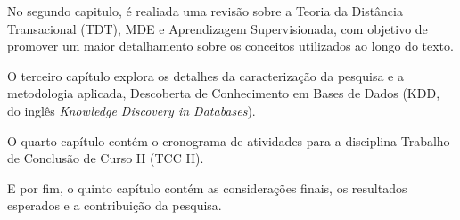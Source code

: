 No segundo capitulo, é realiada uma revisão sobre a Teoria da Distância
Transacional (TDT), MDE e Aprendizagem Supervisionada, com objetivo de promover
um maior detalhamento sobre os conceitos utilizados ao longo do texto.

O terceiro capítulo explora os detalhes da caracterização da pesquisa e a
metodologia aplicada, Descoberta de Conhecimento em Bases de Dados (KDD, do
inglês \textit{Knowledge Discovery in Databases}).

O quarto capítulo contém o cronograma de atividades para a disciplina Trabalho
de Conclusão de Curso II (TCC II).

E por fim, o quinto capítulo contém as considerações finais, os resultados
esperados e a contribuição da pesquisa.
